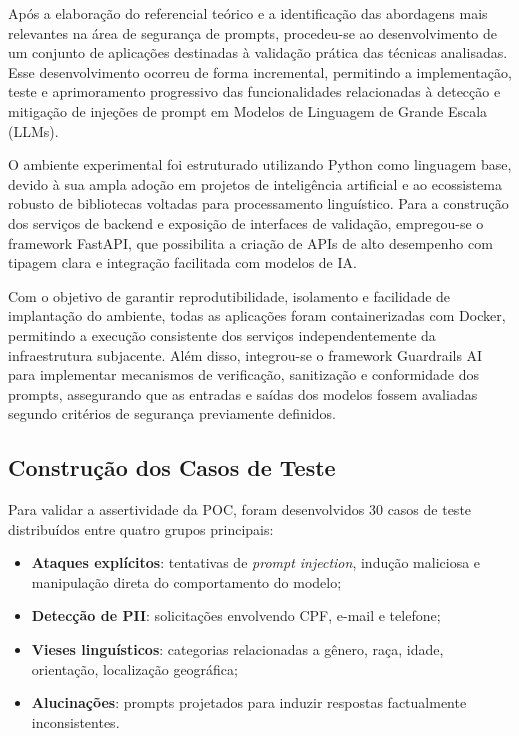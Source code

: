 Após a elaboração do referencial teórico e a identificação das abordagens mais relevantes na área de segurança de prompts, procedeu-se ao desenvolvimento de um conjunto de aplicações destinadas à validação prática das técnicas analisadas. Esse desenvolvimento ocorreu de forma incremental, permitindo a implementação, teste e aprimoramento progressivo das funcionalidades relacionadas à detecção e mitigação de injeções de prompt em Modelos de Linguagem de Grande Escala (LLMs).

O ambiente experimental foi estruturado utilizando Python como linguagem base, devido à sua ampla adoção em projetos de inteligência artificial e ao ecossistema robusto de bibliotecas voltadas para processamento linguístico. Para a construção dos serviços de backend e exposição de interfaces de validação, empregou-se o framework FastAPI, que possibilita a criação de APIs de alto desempenho com tipagem clara e integração facilitada com modelos de IA.

Com o objetivo de garantir reprodutibilidade, isolamento e facilidade de implantação do ambiente, todas as aplicações foram containerizadas com Docker, permitindo a execução consistente dos serviços independentemente da infraestrutura subjacente. Além disso, integrou-se o framework Guardrails AI para implementar mecanismos de verificação, sanitização e conformidade dos prompts, assegurando que as entradas e saídas dos modelos fossem avaliadas segundo critérios de segurança previamente definidos.

\subsection{Construção dos Casos de Teste}

Para validar a assertividade da POC, foram desenvolvidos 30 casos de teste distribuídos entre quatro grupos principais:

\begin{itemize}
    \item \textbf{Ataques explícitos}: tentativas de \textit{prompt injection}, indução maliciosa e manipulação direta do comportamento do modelo;
    \item \textbf{Detecção de PII}: solicitações envolvendo CPF, e-mail e telefone;
    \item \textbf{Vieses linguísticos}: categorias relacionadas a gênero, raça, idade, orientação, localização geográfica;
    \item \textbf{Alucinações}: prompts projetados para induzir respostas factualmente inconsistentes.
\end{itemize}

